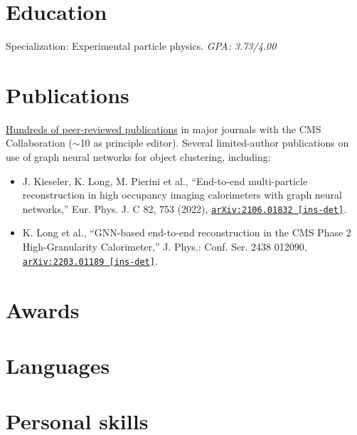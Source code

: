 \documentclass[9pt,a4paper]{moderncv}
\begin{document}
\section{Education}
{
    Specialization: Experimental particle physics.
    \normalsize \textit{GPA: 3.73/4.00} 
}

\section{Publications}
\href{https://inspirehep.net/authors/1280606}{Hundreds of peer-reviewed publications} in major journals with the CMS Collaboration ($\sim$10 as principle editor). Several limited-author publications on use of graph neural networks for object clustering, including:
\begin{itemize}
    \item J. Kieseler, K. Long, M. Pierini et al., ``End-to-end multi-particle reconstruction in high occupancy imaging calorimeters with graph neural networks,'' Eur. Phys. J. C 82, 753 (2022), \href{https://arxiv.org/abs/2106.01832}{\texttt{arXiv:2106.01832 [ins-det]}}.
    \item K. Long et al., ``GNN-based end-to-end reconstruction in the CMS Phase 2 High-Granularity Calorimeter,'' J. Phys.: Conf. Ser. 2438 012090, \href{https://arxiv.org/abs/2203.01189 }{\texttt{arXiv:2203.01189 [ins-det]}}.
\end{itemize}

\pagebreak
\section{Awards}
\section{Languages}

\section{Personal skills}
\end{document}
